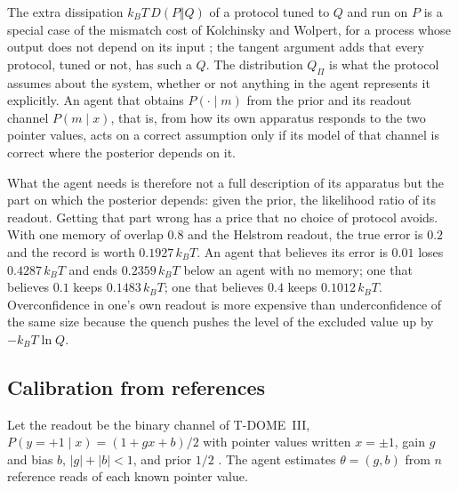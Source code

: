 \documentclass[12pt]{article}
\begin{document}
The extra dissipation $k_BT\,D(P\Vert Q)$ of a protocol tuned to $Q$ and run on $P$ is a special case of the mismatch cost of Kolchinsky and Wolpert, for a process whose output does not depend on its input \cite{KolchinskyWolpert2017}; the tangent argument adds that every protocol, tuned or not, has such a $Q$. The distribution $Q_\Pi$ is what the protocol assumes about the system, whether or not anything in the agent represents it explicitly. An agent that obtains $P(\cdot\mid m)$ from the prior and its readout channel $P(m\mid x)$, that is, from how its own apparatus responds to the two pointer values, acts on a correct assumption only if its model of that channel is correct where the posterior depends on it.

What the agent needs is therefore not a full description of its apparatus but the part on which the posterior depends: given the prior, the likelihood ratio of its readout. Getting that part wrong has a price that no choice of protocol avoids. With one memory of overlap $0.8$ and the Helstrom readout, the true error is $0.2$ and the record is worth $0.1927\,k_BT$. An agent that believes its error is $0.01$ loses $0.4287\,k_BT$ and ends $0.2359\,k_BT$ below an agent with no memory; one that believes $0.1$ keeps $0.1483\,k_BT$; one that believes $0.4$ keeps $0.1012\,k_BT$. Overconfidence in one's own readout is more expensive than underconfidence of the same size because the quench pushes the level of the excluded value up by $-k_BT\ln Q$.

\subsection{Calibration from references}

Let the readout be the binary channel of T-DOME~III, $P(y=+1\mid x)=(1+gx+b)/2$ with pointer values written $x=\pm1$, gain $g$ and bias $b$, $|g|+|b|<1$, and prior $1/2$ \cite{Liu2026TDOME_III}. The agent estimates $\theta=(g,b)$ from $n$ reference reads of each known pointer value.
\end{document}
